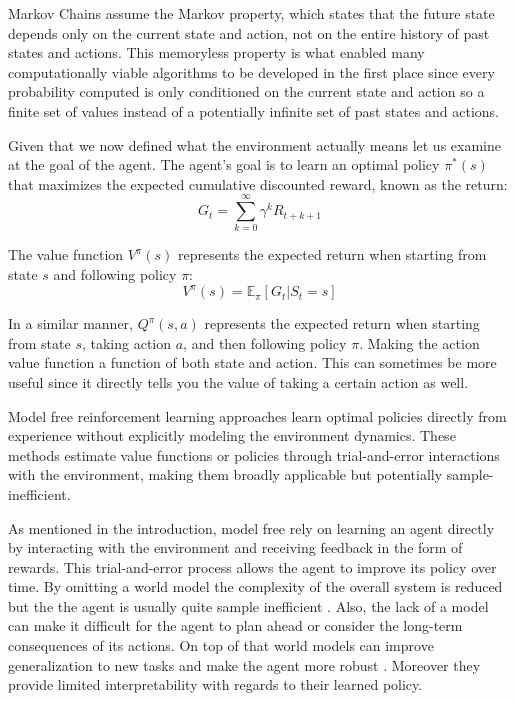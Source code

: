 \documentclass[
	english,
	ruledheaders=section,
	class=report,
	thesis={type=master},
	accentcolor=9c,
	custommargins=true,
	marginpar=false,
	parskip=half-,
	fontsize=11pt,
]{tudapub}
\begin{document}
Markov Chains assume the Markov property, which states that the future state
depends only on the current state and action, not on the entire history of past
states and actions. This memoryless property is what enabled many
computationally viable algorithms to be developed in the first place since
every probability computed is only conditioned on the current state and action
so a finite set of values instead of a potentially infinite set of past states
and actions.

Given that we now defined what the environment actually means let us examine at
the goal of the agent. The agent's goal is to learn an optimal policy
$\pi^*(s)$ that maximizes the expected cumulative discounted reward, known as
the return:
\begin{equation}
	G_t = \sum_{k=0}^{\infty} \gamma^k R_{t+k+1}
\end{equation}

The value function $V^\pi(s)$ represents the expected return when starting from
state $s$ and following policy $\pi$:
\begin{equation}
	V^\pi(s) = \mathbb{E}_\pi[G_t | S_t = s]
\end{equation}

In a similar manner, $Q^\pi(s,a)$ represents the expected return when starting
from state $s$, taking action $a$, and then following policy $\pi$. Making the
action value function a function of both state and action. This can sometimes
be more useful since it directly tells you the value of taking a certain action
as well.

Model free reinforcement learning approaches learn optimal policies directly
from experience without explicitly modeling the environment dynamics. These
methods estimate value functions or policies through trial-and-error
interactions with the environment, making them broadly applicable but
potentially sample-inefficient.

As mentioned in the introduction, model free rely on learning an agent directly
by interacting with the environment and receiving feedback in the form of
rewards. This trial-and-error process allows the agent to improve its policy
over time. By omitting a world model the complexity of the overall system is
reduced but the the agent is usually quite sample inefficient
\cite{duan2016benchmarking,kaiser2019model}. Also, the lack of a model can make
it difficult for the agent to plan ahead or consider the long-term consequences
of its actions. On top of that world models can improve generalization to new
tasks and make the agent more robust \cite{ha2018world,hafner2020dream}.
Moreover they provide limited interpretability with regards to their learned
policy.
\end{document}
